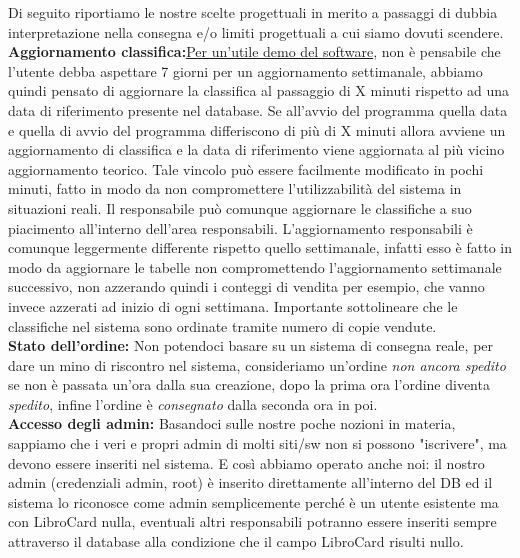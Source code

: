 \documentclass[a4paper,12pt,titlepage]{article}
\begin{document}
Di seguito riportiamo le nostre scelte progettuali in merito a passaggi di dubbia interpretazione nella consegna 
e/o limiti progettuali a cui siamo dovuti scendere.\\


\textbf{Aggiornamento classifica:}\underline{Per un'utile demo del software}, non è pensabile che l'utente debba aspettare 7 giorni per un aggiornamento settimanale, abbiamo quindi pensato di aggiornare la classifica al passaggio di X minuti rispetto ad una data di riferimento presente nel database.
Se all'avvio del programma quella data e quella di avvio del programma differiscono di più di X minuti allora avviene un aggiornamento di classifica e la data di riferimento viene aggiornata al più vicino aggiornamento teorico. Tale vincolo può essere facilmente modificato in pochi minuti, fatto in modo da non compromettere l'utilizzabilità del sistema in situazioni reali.
Il responsabile può comunque aggiornare le classifiche a suo piacimento all'interno dell'area responsabili.
L'aggiornamento responsabili è comunque leggermente differente rispetto quello settimanale,
infatti esso è fatto in modo da aggiornare le tabelle non compromettendo l'aggiornamento settimanale successivo,
non azzerando quindi i conteggi di vendita per esempio, che vanno invece azzerati ad inizio di ogni settimana.
Importante sottolineare che le classifiche nel sistema sono ordinate tramite numero di copie vendute.\\

\textbf{Stato dell'ordine:} Non potendoci basare su un sistema di consegna reale, per dare un mino di riscontro nel sistema, consideriamo un'ordine \textit{non ancora spedito} se non è passata un'ora dalla sua creazione,
dopo la prima ora l'ordine diventa \textit{spedito}, infine l'ordine è \textit{consegnato}  dalla seconda ora in poi.\\

\textbf{Accesso degli admin:} Basandoci sulle nostre poche nozioni in materia, sappiamo che i veri e 
propri admin di molti siti/sw non si possono "iscrivere", ma devono essere inseriti nel sistema. 
E così abbiamo operato anche noi: il nostro admin (credenziali admin, root) è inserito direttamente 
all'interno del DB ed il sistema lo riconosce come admin semplicemente perché è un utente esistente ma con LibroCard nulla,
eventuali altri responsabili potranno essere inseriti sempre attraverso il database alla condizione che il campo LibroCard risulti nullo.\\
\end{document}
